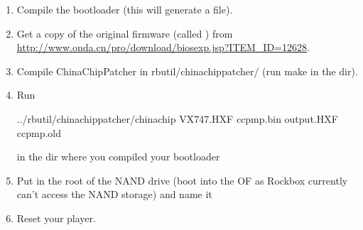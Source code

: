\begin{enumerate}
\item Compile the bootloader (this will generate a  file).

\item Get a copy of the original \playerman{} firmware (called ) from
  \url{http://www.onda.cn/pro/download/biosexp.jsp?ITEM_ID=12628}.

\item Compile ChinaChipPatcher in rbutil/chinachippatcher/ (run make in the dir).

\item Run
\begin{code} 
    ../rbutil/chinachippatcher/chinachip VX747.HXF ccpmp.bin output.HXF ccpmp.old
\end{code}
    in the dir where you compiled your bootloader

\item Put  in the root of the NAND drive (boot into the OF as
    Rockbox currently can't access the NAND storage) and name it 

\item Reset your player. 

\end{enumerate}

